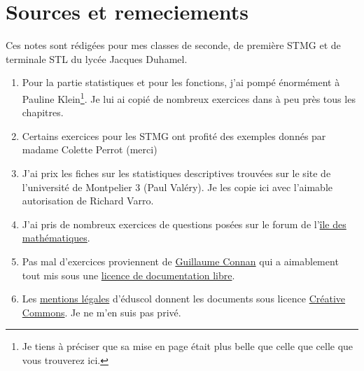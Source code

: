 
\section*{Sources et remeciements}

Ces notes sont rédigées pour mes classes de seconde, de première STMG et de terminale STL du lycée Jacques Duhamel.

\begin{enumerate}
    \item
        
        Pour la partie statistiques et pour les fonctions, j'ai pompé énormément à Pauline Klein\footnote{Je tiens à préciser que sa mise en page était plus belle que celle que celle que vous trouverez ici.}. Je lui ai copié de nombreux exercices dans à peu près tous les chapitres.

    \item

        Certains exercices pour les STMG ont profité des exemples donnés par madame Colette Perrot (merci) 
    \item
        J'ai prix les fiches \cite{qyKnLf} sur les statistiques descriptives trouvées sur le site de l'université de Montpelier 3 (Paul Valéry). Je les copie ici avec l'aimable autorisation de Richard Varro.
    \item
        J'ai pris de nombreux exercices de questions posées sur le forum de l'\href{http://www.ilemaths.net/forum_lycee.php}{île des mathématiques}.
    \item
        Pas mal d'exercices proviennent de \href{http://tehessin.tuxfamily.org/?page=35}{Guillaume Connan} qui a aimablement tout mis sous une \href{http://guilde.jeunes-chercheurs.org/Guilde/Licence/ldl.html}{licence de documentation libre}.
    \item
        Les \href{http://eduscol.education.fr/cid49154/mentions-legales.html}{mentions légales} d'éduscol donnent les documents sous licence \href{http://creativecommons.org/licenses/by-nc-sa/2.0/fr/}{Créative Commons}. Je ne m'en suis pas privé.
\end{enumerate}
